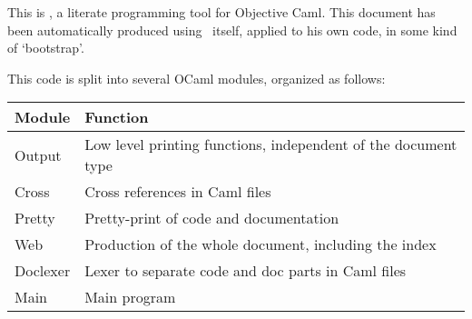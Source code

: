 
\newcommand{\ocaml}{\textsf{Objective Caml}}

\ocwsection
This is \ocamlweb, a literate programming tool for \ocaml.
This document has been automatically produced using \ocamlweb\ itself,
applied to his own code, in some kind of `bootstrap'.

This code is split into several OCaml modules, organized as follows:

\begin{center}
\begin{tabular}{|l|l|}
  \hline
  \bf Module  &  \bf Function \\
  \hline\hline
  Output  &  Low level printing functions, independent of the document
  type \\
  \hline
  Cross   & Cross references in Caml files \\
  \hline
  Pretty  & Pretty-print of code and documentation \\
  \hline
  Web     & Production of the whole document, including the index \\
  \hline
  Doclexer& Lexer to separate code and doc parts in Caml files \\
  \hline
  Main    & Main program \\
  \hline
\end{tabular}
\end{center}
